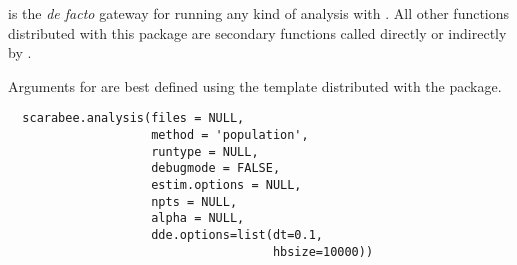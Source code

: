 %
\begin{Description}\relax
{} is the \emph{de facto} gateway for running any kind 
of analysis with . All other functions distributed with this
package are secondary functions called directly or indirectly by
.

Arguments for  are best defined using the template
distributed with the package.

\end{Description}
%
\begin{Usage}
\begin{verbatim}
  scarabee.analysis(files = NULL,
                    method = 'population',
                    runtype = NULL,
                    debugmode = FALSE,
                    estim.options = NULL,
                    npts = NULL,
                    alpha = NULL,
                    dde.options=list(dt=0.1,
                                     hbsize=10000))
\end{verbatim}
\end{Usage}
%
